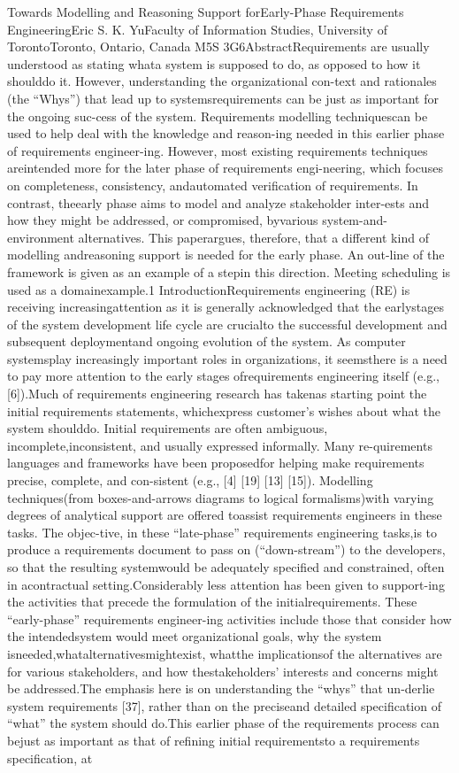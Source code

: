Towards Modelling and Reasoning Support forEarly-Phase Requirements EngineeringEric S. K. YuFaculty of Information Studies, University of TorontoToronto, Ontario, Canada M5S 3G6AbstractRequirements are usually understood as stating whata system is supposed to do, as opposed to how it shoulddo it. However, understanding the organizational con-text and rationales (the “Whys”) that lead up to systemsrequirements can be just as important for the ongoing suc-cess of the system. Requirements modelling techniquescan be used to help deal with the knowledge and reason-ing needed in this earlier phase of requirements engineer-ing. However, most existing requirements techniques areintended more for the later phase of requirements engi-neering, which focuses on completeness, consistency, andautomated veriﬁcation of requirements. In contrast, theearly phase aims to model and analyze stakeholder inter-ests and how they might be addressed, or compromised, byvarious system-and-environment alternatives. This paperargues, therefore, that a different kind of modelling andreasoning support is needed for the early phase. An out-line of the framework is given as an example of a stepin this direction. Meeting scheduling is used as a domainexample.1 IntroductionRequirements engineering (RE) is receiving increasingattention as it is generally acknowledged that the earlystages of the system development life cycle are crucialto the successful development and subsequent deploymentand ongoing evolution of the system. As computer systemsplay increasingly important roles in organizations, it seemsthere is a need to pay more attention to the early stages ofrequirements engineering itself (e.g., [6]).Much of requirements engineering research has takenas starting point the initial requirements statements, whichexpress customer’s wishes about what the system shoulddo. Initial requirements are often ambiguous, incomplete,inconsistent, and usually expressed informally. Many re-quirements languages and frameworks have been proposedfor helping make requirements precise, complete, and con-sistent (e.g., [4] [19] [13] [15]). Modelling techniques(from boxes-and-arrows diagrams to logical formalisms)with varying degrees of analytical support are offered toassist requirements engineers in these tasks. The objec-tive, in these “late-phase” requirements engineering tasks,is to produce a requirements document to pass on (“down-stream”) to the developers, so that the resulting systemwould be adequately speciﬁed and constrained, often in acontractual setting.Considerably less attention has been given to support-ing the activities that precede the formulation of the initialrequirements. These “early-phase” requirements engineer-ing activities include those that consider how the intendedsystem would meet organizational goals, why the system isneeded,whatalternativesmightexist, whatthe implicationsof the alternatives are for various stakeholders, and how thestakeholders’ interests and concerns might be addressed.The emphasis here is on understanding the “whys” that un-derlie system requirements [37], rather than on the preciseand detailed speciﬁcation of “what” the system should do.This earlier phase of the requirements process can bejust as important as that of reﬁning initial requirementsto a requirements speciﬁcation, at 